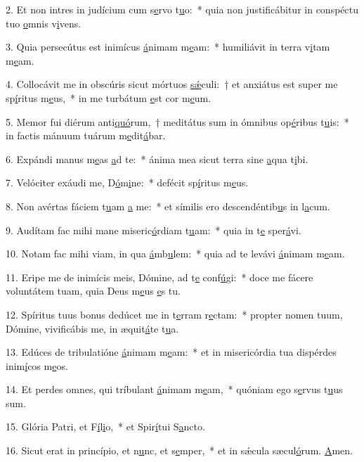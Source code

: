 2. Et non intres in judícium cum s\uline{e}rvo t\uline{u}o:~* quia non justificábitur in conspéctu tuo \uline{o}mnis v\uline{i}vens.\par 
3. Quia persecútus est inimícus \uline{á}nimam m\uline{e}am:~* humiliávit in terra v\uline{i}tam m\uline{e}am.\par 
4. Collocávit me in obscúris sicut mórtuos \uline{sǽ}culi:~† et anxiátus est super me sp\uline{í}ritus m\uline{e}us,~* in me turbátum \uline{e}st cor m\uline{e}um.\par 
5. Memor fui diérum anti\uline{quó}rum,~† meditátus sum in ómnibus op\uline{é}ribus t\uline{u}is:~* in factis mánuum tuárum m\uline{e}dit\uline{á}bar.\par 
6. Expándi manus m\uline{e}as \uline{a}d te:~* ánima mea sicut terra sine \uline{a}qua t\uline{i}bi.\par 
7. Velóciter exáudi me, D\uline{ó}m\uline{i}ne:~* defécit sp\uline{í}ritus m\uline{e}us.\par 
8. Non avértas fáciem t\uline{u}am \uline{a} me:~* et símilis ero descendéntib\uline{u}s in l\uline{a}cum.\par 
9. Audítam fac mihi mane miseric\uline{ó}rdiam t\uline{u}am:~* quia in t\uline{e} sper\uline{á}vi.\par 
10. Notam fac mihi viam, in qua \uline{á}mb\uline{u}lem:~* quia ad te levávi \uline{á}nimam m\uline{e}am.\par 
11. Eripe me de inimícis meis, Dómine, ad t\uline{e} conf\uline{ú}gi:~* doce me fácere voluntátem tuam, quia Deus m\uline{e}us \uline{e}s tu.\par 
12. Spíritus tuus bonus dedúcet me in t\uline{e}rram r\uline{e}ctam:~* propter nomen tuum, Dómine, vivificábis me, in æquit\uline{á}te t\uline{u}a.\par 
13. Edúces de tribulatióne \uline{á}nimam m\uline{e}am:~* et in misericórdia tua dispérdes inim\uline{í}cos m\uline{e}os.\par 
14. Et perdes omnes, qui tríbulant \uline{á}nimam m\uline{e}am,~* quóniam ego s\uline{e}rvus t\uline{u}us sum.\par 
15. Glória Patri, et F\uline{í}l\uline{i}o,~* et Spir\uline{í}tui S\uline{a}ncto.\par 
16. Sicut erat in princípio, et n\uline{u}nc, et s\uline{e}mper,~* et in sǽcula sæcul\uline{ó}rum. \uline{A}men.\par 
